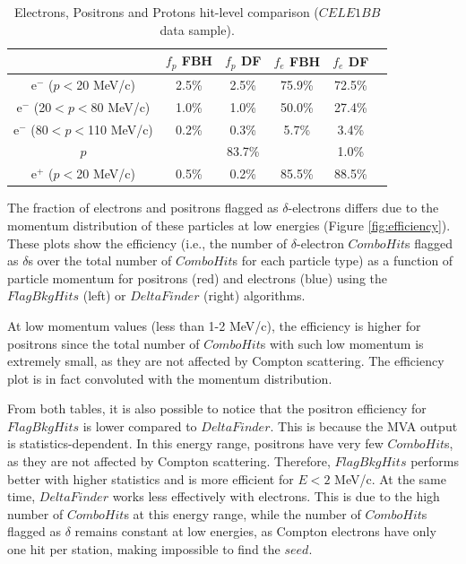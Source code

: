     \begin{center}
    \begin{table}[h!]
    \centering
    \renewcommand{\arraystretch}{1.}
    \begin{tabular}{| c | c | c | c | c | c |} 
    \hline
    &  $f_{p}$ FBH &  $f_{p}$ DF & $f_{e}$ FBH  & $f_{e}$ DF \\
    \hline
    e$^-$ ($p<$20 MeV/c)      & 2.5\% & 2.5\%   & 75.9\% & 72.5\%\\
    \hline
    e$^-$ (20$<p<$80 MeV/c)  & 1.0\%& 1.0\%   & 50.0\%& 27.4\%\\
    \hline
    e$^-$ (80$<p<$110 MeV/c)   & 0.2\%& 0.3\%  &  5.7\%& 3.4\%\\
    \hline
    $p$       &              &         83.7\%           &  & 1.0\%\\
    \hline
    e$^+$ ($p<$20 MeV/c)   & 0.5\%    & 0.2\%    &   85.5\%& 88.5\%\\
    \hline
    \end{tabular}
    \caption[Electrons, Positrons and Protons hit-level comparison.]{Electrons, 
    Positrons and Protons hit-level comparison ($CELE1BB$ data sample).}
    \end{table}\label{tab:1bbcele}
    \end{center}
  
The fraction of electrons and positrons flagged as $\delta$-electrons 
differs due to the momentum distribution of these particles at low energies 
(Figure \ref{fig:efficiency}). These plots show the efficiency 
(i.e., the number of $\delta$-electron $ComboHit$s flagged as $\delta$s 
over the total number of $ComboHit$s for each particle type) as a function 
of particle momentum for positrons (red) and electrons (blue) using the 
$FlagBkgHits$ (left) or $DeltaFinder$ (right) algorithms. 

At low momentum values (less than 1-2 MeV/c), the efficiency 
is higher for positrons since the total number of $ComboHit$s 
with such low momentum is extremely small, as they are 
not affected by Compton scattering. The efficiency plot 
is in fact convoluted with the momentum distribution.

From both tables, it is also possible to notice that the positron 
efficiency for $FlagBkgHits$ is lower compared to $DeltaFinder$. 
This is because the MVA output is statistics-dependent. In this energy 
range, positrons have very few $ComboHit$s, as they are not 
affected by Compton scattering. Therefore, $FlagBkgHits$ performs 
better with higher statistics and is more efficient for $E < 2$ MeV/c. 
At the same time, $DeltaFinder$ works less effectively with electrons. 
This is due to the high number of $ComboHit$s at this energy range, 
while the number of $ComboHit$s flagged as $\delta$ remains constant 
at low energies, as Compton electrons have only one 
hit per station, making impossible to find the $seed$. 

